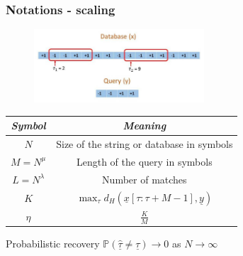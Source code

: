 \documentclass[10pt,xcolor=table]{beamer}
\newcommand{\mbb}{\mathbb}
\newcommand{\xv}{\underline{x}}
\newcommand{\yv}{\underline{y}}
\begin{document}
\begin{frame}\frametitle{Notations - scaling}

	\begin{figure}[t]
		\centering
		\includegraphics[width=2.5in]{Pattern_matching_ex.pdf}
	\end{figure}
	\vspace{-8pt}
	{\small
	\begin{table}[h!]
		\label{Table:Notations3}
		\begin{center}
			\begin{tabular}{|c|c|} 	
				\hline		
				\textit{Symbol}		&  \textit{Meaning} \\		
				\hline
				$N$           		& Size of the string or database in symbols \\
				\hline
				$M = N^{\mu}$       & Length of the query in symbols \\
				\hline
				$L = N^\lambda$    &   Number of matches \\
				\hline
				$K$             &$\max_{\tau}d_{H}(\xv[\tau:\tau+M-1],\yv)$\\
				\hline
				$\eta$             &$\frac{K}{M}$\\
				\hline
			\end{tabular}
		\end{center}
	\end{table}
    }
    \begin{block}{Probabilistic recovery}
    $\mbb{P}(\hat{\underline{\tau}} \neq \underline{\tau}) \rightarrow 0$ as $N \rightarrow \infty$
    \end{block}
	\end{frame}	
\end{document}
